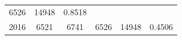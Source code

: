 \documentclass[10pt,]{article}
\begin{document}
\begin{longtable}[]{@{}cccccc@{}}
\begin{minipage}[t]{0.20\columnwidth}
6526\strut
\end{minipage} & \begin{minipage}[t]{0.16\columnwidth}\centering\strut
14948\strut
\end{minipage} & \begin{minipage}[t]{0.12\columnwidth}\centering\strut
0.8518\strut
\end{minipage}\tabularnewline
\begin{minipage}[t]{0.10\columnwidth}\centering\strut
2016\strut
\end{minipage} & \begin{minipage}[t]{0.13\columnwidth}\centering\strut
6521\strut
\end{minipage} & \begin{minipage}[t]{0.09\columnwidth}\centering\strut
6741\strut
\end{minipage} & \begin{minipage}[t]{0.20\columnwidth}\centering\strut
6526\strut
\end{minipage} & \begin{minipage}[t]{0.16\columnwidth}\centering\strut
14948\strut
\end{minipage} & \begin{minipage}[t]{0.12\columnwidth}\centering\strut
0.4506\strut
\end{minipage}\tabularnewline
\bottomrule
\end{longtable}
\end{document}
